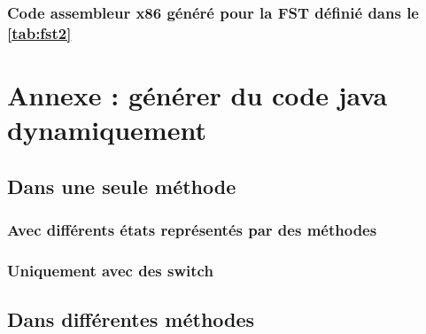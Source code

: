 \clearpage
\subsubsection{Code assembleur x86 généré pour la FST définié dans le \autoref{tab:fst2}}



\clearpage

\section{Annexe : générer du code java dynamiquement}

\subsection{Dans une seule méthode}

\subsubsection{Avec différents états représentés par des méthodes}




\clearpage
\subsubsection{Uniquement avec des switch}



\clearpage
\subsection{Dans différentes méthodes}




